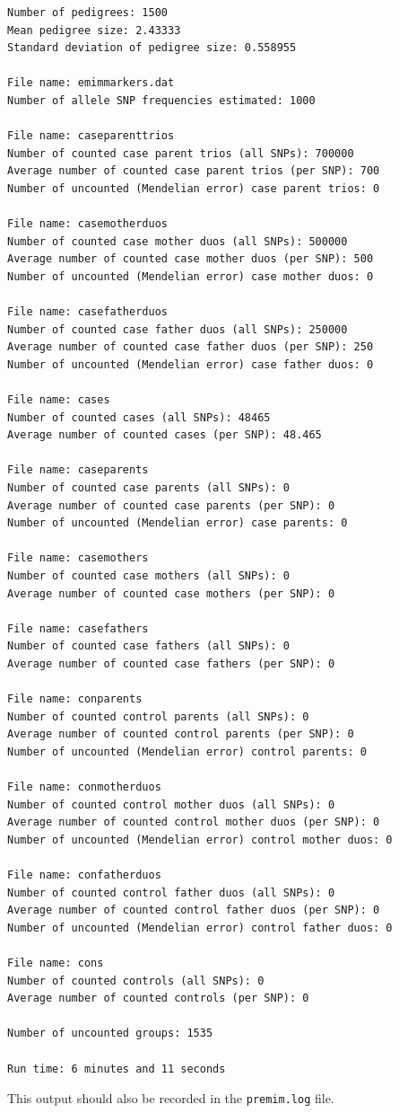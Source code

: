 \documentclass[a4paper,12pt]{article}
\newcommand{\code}[1]{{\footnotesize{{\tt #1}}}}
\begin{document}
\begin{lstlisting}
Number of pedigrees: 1500
Mean pedigree size: 2.43333
Standard deviation of pedigree size: 0.558955

File name: emimmarkers.dat
Number of allele SNP frequencies estimated: 1000

File name: caseparenttrios
Number of counted case parent trios (all SNPs): 700000
Average number of counted case parent trios (per SNP): 700
Number of uncounted (Mendelian error) case parent trios: 0

File name: casemotherduos
Number of counted case mother duos (all SNPs): 500000
Average number of counted case mother duos (per SNP): 500
Number of uncounted (Mendelian error) case mother duos: 0

File name: casefatherduos
Number of counted case father duos (all SNPs): 250000
Average number of counted case father duos (per SNP): 250
Number of uncounted (Mendelian error) case father duos: 0

File name: cases
Number of counted cases (all SNPs): 48465
Average number of counted cases (per SNP): 48.465

File name: caseparents
Number of counted case parents (all SNPs): 0
Average number of counted case parents (per SNP): 0
Number of uncounted (Mendelian error) case parents: 0

File name: casemothers
Number of counted case mothers (all SNPs): 0
Average number of counted case mothers (per SNP): 0

File name: casefathers
Number of counted case fathers (all SNPs): 0
Average number of counted case fathers (per SNP): 0

File name: conparents
Number of counted control parents (all SNPs): 0
Average number of counted control parents (per SNP): 0
Number of uncounted (Mendelian error) control parents: 0

File name: conmotherduos
Number of counted control mother duos (all SNPs): 0
Average number of counted control mother duos (per SNP): 0
Number of uncounted (Mendelian error) control mother duos: 0

File name: confatherduos
Number of counted control father duos (all SNPs): 0
Average number of counted control father duos (per SNP): 0
Number of uncounted (Mendelian error) control father duos: 0

File name: cons
Number of counted controls (all SNPs): 0
Average number of counted controls (per SNP): 0

Number of uncounted groups: 1535

Run time: 6 minutes and 11 seconds

\end{lstlisting} \vspace{0.35cm}
This output should also be recorded in the \code{premim.log} file. 
\end{document}
